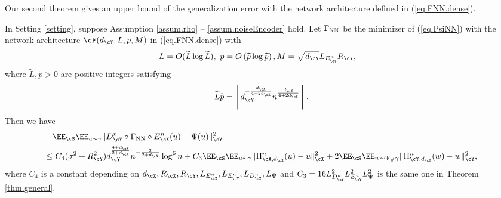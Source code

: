 \documentclass[11pt]{article} %
\begin{document}
Our second theorem gives an upper bound of the generalization error with the network architecture defined in (\ref{eq.FNN.dense}).
\begin{theorem}\label{thm.general.dense}
	In Setting \ref{setting},
	suppose Assumption \ref{assum.rho} -- \ref{assum.noiseEncoder} hold. Let $\Gamma_{\rm NN}$ be the minimizer of (\ref{eq.PsiNN}) with the network architecture $\cF(d_{\cY},L,p,M)$ in (\ref{eq.FNN.dense}) with
	\begin{equation}
		\begin{aligned}
			&L=O(\widetilde{L}\log \widetilde{L}), \ p=O\left(\widetilde{p} \log \widetilde{p}\right), M=\sqrt{d_{\cY}}L_{E^n_{\cY}}R_{\cY},
		\end{aligned}\label{eq.NN.parameter.n.dense}
	\end{equation}
	where $\widetilde{L},\widetilde{p}>0$ are positive integers satisfying 
	\begin{equation}
	\widetilde{L}\widetilde{p}=\left\lceil d_{\cY}^{-\frac{d_{\cX}}{4+2d_{\cX}}}n^{\frac{d_{\cX}}{4+2d_{\cX}}}\right\rceil.
	\label{eq.FNN.densecondition}
	\end{equation}
	Then we have
	\begin{align}
		&\EE_{\cS}\EE_{u\sim \gamma}\|D_{\cY}^n\circ \Gamma_{\rm NN} \circ E_{\cX}^n(u)- \Psi(u)\|_{\cY}^2 \nonumber\\
		\leq&\ C_{4}(\sigma^2+R_{\cY}^2)d_{\cY}^{\frac{4+d_{\cX}}{2+d_{\cX}}}n^{-\frac{2}{2+d_{\cX}}}\log^6 n  +  C_3\EE_{\cS}\EE_{u\sim \gamma}\| \Pi_{\cX,d_{\cX}}^n(u)- u\|_{\cX}^2+2\EE_{\cS}\EE_{w\sim \Psi_{\#}\gamma}\|\Pi_{\cY,d_{\cY}}^n(w)- w\|_{\cY}^2,
	\label{eq.error.general.dense}
	\end{align}
	where $C_{4}$ is a constant depending on $d_{\cX},R_{\cX}, R_{\cY},L_{E^n_{\cX}},L_{E^n_{\cY}},L_{D^n_{\cX}},L_{\Psi}$ and $C_3=16L_{D^n_{\cY}}^2 L_{E^n_{\cY}}^2L_{\Psi}^2$ is the same one in Theorem \ref{thm.general}.
\end{theorem}
\end{document}
